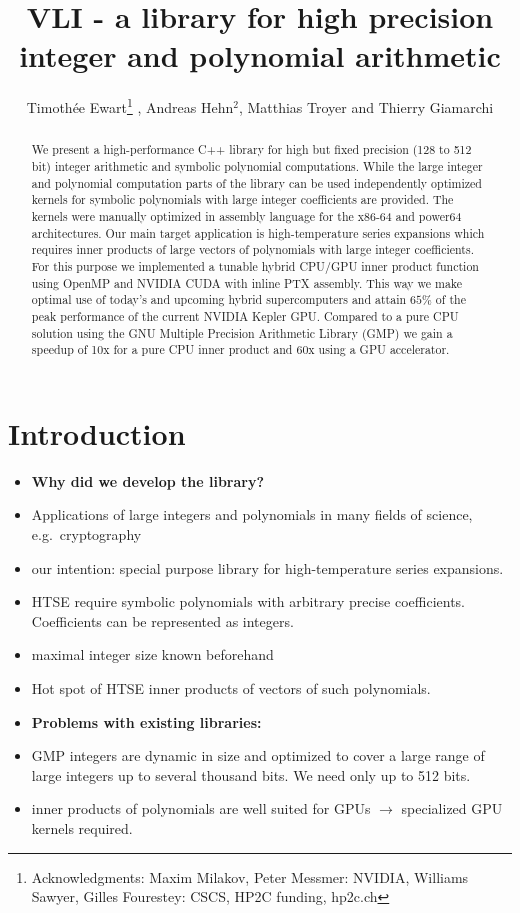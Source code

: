 \documentclass[oribibl]{llncs2e/llncs}
\title{VLI - a library for high precision integer and polynomial arithmetic}
\author{Timoth\'ee Ewart\inst{1}\thanks{Acknowledgments: Maxim Milakov, Peter Messmer:   NVIDIA,   Williams Sawyer, Gilles Fourestey:  CSCS, HP2C funding, hp2c.ch}  , Andreas Hehn$^2$, Matthias Troyer\inst{2} and Thierry Giamarchi\inst{1}}
\institute{Universit\'e de Gen\`eve, \email{timothee.ewart@gmail.com}  \and Eidgen\"ossische Technische Hochschule Z\"urich }
\begin{document}
\maketitle


\begin{abstract}
We present a high-performance C++ library for high but fixed precision
(128 to 512 bit) integer arithmetic and symbolic polynomial
computations. While the large integer and polynomial computation parts
of the library can be used independently optimized kernels for symbolic
polynomials with large integer coefficients are provided. The kernels
were manually optimized in assembly language for the x86-64 and power64
architectures. Our main target application is high-temperature series
expansions which requires inner products of large vectors of polynomials
with large integer coefficients. For this purpose we implemented a
tunable hybrid CPU/GPU inner product function using OpenMP and NVIDIA
CUDA with inline PTX assembly. This way we make optimal use of today's
and upcoming hybrid supercomputers and attain $65\%$ of the peak
performance of the current NVIDIA Kepler GPU. Compared to a pure CPU
solution using the GNU Multiple Precision Arithmetic Library (GMP) we
gain a speedup of 10x for a pure CPU inner product and 60x using a GPU
accelerator.
\end{abstract}

\section{Introduction}
\begin{itemize}
\item {\bf Why did we develop the library?}
\item Applications of large integers and polynomials in many fields of science, e.g.\ cryptography
\item our intention: special purpose library for high-temperature series expansions.
\item HTSE require symbolic polynomials with arbitrary precise coefficients. Coefficients can be represented as integers.
\item maximal integer size known beforehand
\item Hot spot of HTSE inner products of vectors of such polynomials.
\item {\bf Problems with existing libraries:}
\item GMP integers \cite{GMP} are dynamic in size and optimized to cover a large range of large integers up to several thousand bits. We need only up to 512 bits.
\item inner products of polynomials are well suited for GPUs $\rightarrow$ specialized GPU kernels required.
\end{itemize}
\end{document}
